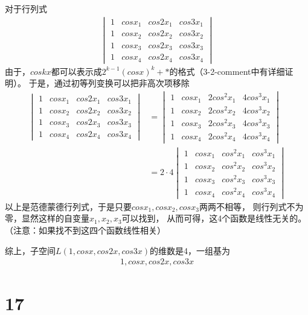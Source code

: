 \documentclass{article}
\begin{document}
对于行列式
\begin{align*}
  \begin{vmatrix}
    1 & cos x_1 & cos 2 x_1 & cos 3 x_1 \\
    1 & cos x_2 & cos 2 x_2 & cos 3 x_2 \\
    1 & cos x_3 & cos 2 x_3 & cos 3 x_3 \\
    1 & cos x_4 & cos 2 x_4 & cos 3 x_4
  \end{vmatrix}
\end{align*}
由于，$cos kx$都可以表示成$2^{k - 1} (cos x)^k + *$的格式（3-2-comment中有详细证明）。
于是，通过初等列变换可以把非高次项移除
\begin{align*}
  \begin{vmatrix}
    1 & cos x_1 & cos 2 x_1 & cos 3 x_1 \\
    1 & cos x_2 & cos 2 x_2 & cos 3 x_2 \\
    1 & cos x_3 & cos 2 x_3 & cos 3 x_3 \\
    1 & cos x_4 & cos 2 x_4 & cos 3 x_4
  \end{vmatrix}
   & =
  \begin{vmatrix}
    1 & cos x_1 & 2 cos^2 x_1 & 4 cos^3 x_1 \\
    1 & cos x_2 & 2 cos^2 x_2 & 4 cos^3 x_2 \\
    1 & cos x_3 & 2 cos^2 x_3 & 4 cos^3 x_3 \\
    1 & cos x_4 & 2 cos^2 x_4 & 4 cos^3 x_4
  \end{vmatrix} \\
   & = 2 \cdot 4
  \begin{vmatrix}
    1 & cos x_1 & cos^2 x_1 & cos^3 x_1 \\
    1 & cos x_2 & cos^2 x_2 & cos^3 x_2 \\
    1 & cos x_3 & cos^2 x_3 & cos^3 x_3 \\
    1 & cos x_4 & cos^2 x_4 & cos^3 x_4
  \end{vmatrix}
\end{align*}
以上是范德蒙德行列式，于是只要$cos x_1, cos x_2, cos x_3$两两不相等，
则行列式不为零，显然这样的自变量$x_1, x_2, x_3$可以找到，
从而可得，这4个函数是线性无关的。（注意：如果找不到这四个函数线性相关）

综上，子空间$L(1, cos x, cos 2x, cos 3x)$的维数是4，一组基为
\begin{align*}
  1, cos x, cos 2x, cos 3x
\end{align*}

\section*{17}
\end{document}
